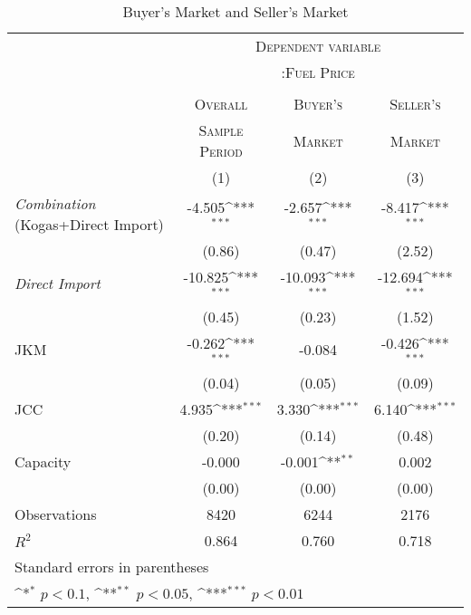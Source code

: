 \documentclass[leqno]{article}
\begin{document}
\begin{table}[h]\centering
\def\sym#1{\ifmmode^{#1}\else\(^{#1}\)\fi}
\caption{Buyer's Market and Seller's Market\label{tab1}}
\begin{tabular}{l*{3}{c}}
\toprule
 & \multicolumn{3}{c}{\textsc{Dependent variable}} \\ 
                     &\multicolumn{3}{c}{\textsc{:Fuel Price}}\\
                                          \cline{2-4}  \\
                  &\multicolumn{1}{c}{\textsc{Overall}}&\multicolumn{1}{c}{\textsc{Buyer's}}&\multicolumn{1}{c}{\textsc{Seller's}}\\           
                 &\multicolumn{1}{c}{\textsc{Sample Period}}&\multicolumn{1}{c}{\textsc{Market}}&\multicolumn{1}{c}{\textsc{Market}}\\     
                    &\multicolumn{1}{c}{(1)}&\multicolumn{1}{c}{(2)}&\multicolumn{1}{c}{(3)}\\

\hline \hline
\addlinespace
\textit{Combination} \small{(Kogas+Direct Import)}          &      -4.505\sym{***}&      -2.657\sym{***}&      -8.417\sym{***}\\
                    &      (0.86)         &      (0.47)         &      (2.52)         \\
\addlinespace
\textit{Direct Import}        &     -10.825\sym{***}&     -10.093\sym{***}&     -12.694\sym{***}\\
                    &      (0.45)         &      (0.23)         &      (1.52)         \\
\addlinespace
JKM                 &      -0.262\sym{***}&      -0.084         &      -0.426\sym{***}\\
                    &      (0.04)         &      (0.05)         &      (0.09)         \\
\addlinespace
JCC                 &       4.935\sym{***}&       3.330\sym{***}&       6.140\sym{***}\\
                    &      (0.20)         &      (0.14)         &      (0.48)         \\
\addlinespace
Capacity            &      -0.000         &      -0.001\sym{**} &       0.002         \\
                    &      (0.00)         &      (0.00)         &      (0.00)         \\
\midrule
Observations                   &    8420         &    6244         &    2176         \\
$R^2$                 &       0.864         &       0.760         &       0.718         \\
\hline \hline
\multicolumn{4}{l}{\footnotesize Standard errors in parentheses}\\
\multicolumn{4}{l}{\footnotesize \sym{*} \(p<0.1\), \sym{**} \(p<0.05\), \sym{***} \(p<0.01\)}\\
\end{tabular}
\end{table}
\end{document}
